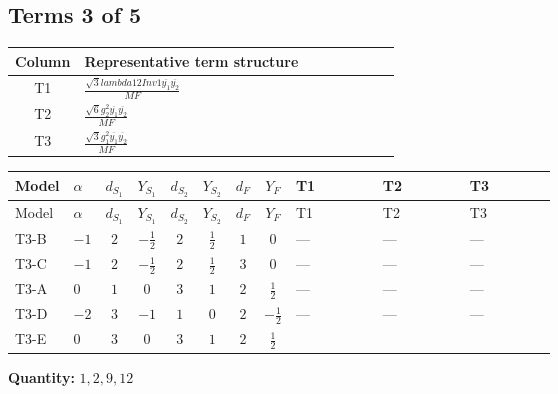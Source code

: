 \documentclass[8pt]{article}
\begin{document}
\begin{landscape}
\subsection*{Terms 3 of 5}
\begin{center}
\begin{tabular}{@{}c >{\raggedright\arraybackslash}p{0.82\linewidth}@{}}
\toprule
Column & Representative term structure \\
\midrule
T1 & \(\displaystyle \frac{\sqrt{3} lambda12Inv1 \overline{y_{1}} \overline{y_{2}}}{MF}\) \\
\midrule
T2 & \(\displaystyle \frac{\sqrt{6} g_{2}^{2} \overline{y_{1}} \overline{y_{2}}}{MF}\) \\
\midrule
T3 & \(\displaystyle \frac{\sqrt{3} g_{1}^{2} \overline{y_{1}} \overline{y_{2}}}{MF}\) \\
\midrule
\bottomrule
\end{tabular}
\end{center}
\smallskip
\tiny
\begin{longtable}{@{}llcccccc >{\raggedright\arraybackslash}p{0.21\linewidth} >{\raggedright\arraybackslash}p{0.21\linewidth} >{\raggedright\arraybackslash}p{0.21\linewidth}@{}}
\toprule
Model & $\alpha$ & $d_{S_1}$ & $Y_{S_1}$ & $d_{S_2}$ & $Y_{S_2}$ & $d_F$ & $Y_F$ & T1 & T2 & T3 \\
\midrule
\endfirsthead
\toprule
Model & $\alpha$ & $d_{S_1}$ & $Y_{S_1}$ & $d_{S_2}$ & $Y_{S_2}$ & $d_F$ & $Y_F$ & T1 & T2 & T3 \\
\midrule
\endhead
T3-B & $-1$ & $2$ & $-\frac{1}{2}$ & $2$ & $\frac{1}{2}$ & $1$ & $0$ & --- & --- & --- \\
\midrule
T3-C & $-1$ & $2$ & $-\frac{1}{2}$ & $2$ & $\frac{1}{2}$ & $3$ & $0$ & --- & --- & --- \\
\midrule
T3-A & $0$ & $1$ & $0$ & $3$ & $1$ & $2$ & $\frac{1}{2}$ & --- & --- & --- \\
\midrule
T3-D & $-2$ & $3$ & $-1$ & $1$ & $0$ & $2$ & $-\frac{1}{2}$ & --- & --- & --- \\
\midrule
T3-E & $0$ & $3$ & $0$ & $3$ & $1$ & $2$ & $\frac{1}{2}$ & \scriptsize\adjustbox{max width=\linewidth}{$\begin{gathered} - \frac{\sqrt{3} lambda12Inv1 \overline{y_{1}} \overline{y_{2}}}{6 MF}\end{gathered}$} & \scriptsize\adjustbox{max width=\linewidth}{$\begin{gathered} \frac{\sqrt{6} g_{2}^{2} \overline{y_{1}} \overline{y_{2}}}{6 MF}\end{gathered}$} & \scriptsize\adjustbox{max width=\linewidth}{$\begin{gathered} \frac{\sqrt{3} g_{1}^{2} \overline{y_{1}} \overline{y_{2}}}{8 MF}\end{gathered}$} \\
\midrule
\bottomrule
\end{longtable}
\clearpage
\noindent\textbf{Quantity: }$\mathrm{1,2,9,12}$\par\smallskip

\end{landscape}
\end{document}
